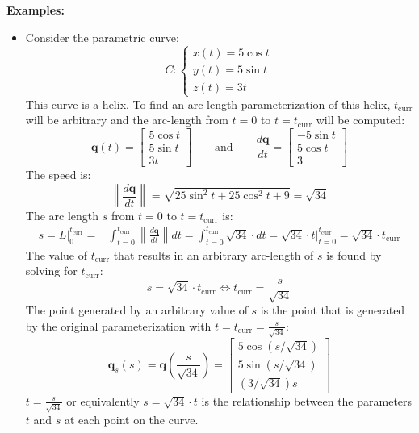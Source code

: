 \documentclass{article}
\begin{document}
\textbf{Examples:}
\begin{itemize}
\item Consider the parametric curve:
\[C: \left\{\begin{array}{c} 
x(t) = 5 \cos t \\  
y(t) = 5 \sin t \\ 
z(t) = 3t 
\end{array}\right.\]
This curve is a helix. To find an arc-length parameterization of this helix, \(t_{\text{curr}}\) will be arbitrary and the arc-length from \(t = 0\) to \(t = t_{\text{curr}}\) will be computed:
\[\mathbf{q}(t) = \begin{bmatrix}
5 \cos t \\  
5 \sin t \\ 
3t 
\end{bmatrix} \quad\quad\text{and}\quad\quad \frac{d\mathbf{q}}{dt} = \begin{bmatrix}
-5 \sin t \\  
5 \cos t \\ 
3  
\end{bmatrix}\]
The speed is:
\[\left\|\frac{d\mathbf{q}}{dt}\right\| = \sqrt{25\sin^2 t + 25\cos^2 t + 9} = \sqrt{34}\] 
The arc length \(s\) from \(t = 0\) to \(t = t_{\text{curr}}\) is: 
\begin{align*}
s = L\Big|_0^{t_{\text{curr}}} = & \int_{t = 0}^{t_{\text{curr}}} \left\|\frac{d\mathbf{q}}{dt}\right\|dt 
= \int_{t = 0}^{t_{\text{curr}}} \sqrt{34} \cdot dt 
= \sqrt{34} \cdot t \bigg|_{t = 0}^{t_{\text{curr}}}  
= \sqrt{34} \cdot t_{\text{curr}}
\end{align*} 
The value of \(t_{\text{curr}}\) that results in an arbitrary arc-length of \(s\) is found by solving for \(t_{\text{curr}}\):
\[s = \sqrt{34} \cdot t_{\text{curr}} \iff t_{\text{curr}} = \frac{s}{\sqrt{34}}\]  
The point generated by an arbitrary value of \(s\) is the point that is generated by the original parameterization with \(t = t_{\text{curr}} = \frac{s}{\sqrt{34}}\):
\[\mathbf{q}_s(s) = \mathbf{q}\left(\frac{s}{\sqrt{34}}\right) = \begin{bmatrix}  
5 \cos(s/\sqrt{34}) \\  
5 \sin(s/\sqrt{34}) \\ 
(3/\sqrt{34})s 
\end{bmatrix}\]
\(t = \frac{s}{\sqrt{34}}\) or equivalently \(s = \sqrt{34} \cdot t\) is the relationship between the parameters \(t\) and \(s\) at each point on the curve.
\end{itemize}
\end{document}
